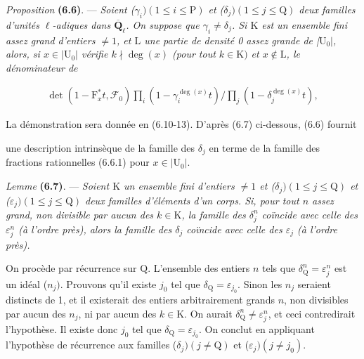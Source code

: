 \documentclass[10pt,leqno]{article}
\begin{document}
\noindent \emph{Proposition} \textbf{(6.6)}. — {\itshape Soient (\(\gamma _{i}) (1\leq i\leq \mathrm{P})\) et (\(\delta _{j}) (1\leq j\leq \mathrm{Q})\) deux familles d’unités \(\ell \)-adiques dans \(\overline{\mathbf{Q}}_{\ell }\). On suppose que \(\gamma _{i}\ne \delta _{j}\). Si \(\mathrm{K}\) est un ensemble fini assez grand d’entiers \(\ne 1\), et \(\mathrm{L}\) une partie de densité 0 assez grande de |\(\mathrm{U}_{0}|\), alors, si \(x\in |\mathrm{U}_{0}|\) vérifie \(k\nmid \operatorname{deg}(x)\) (pour tout \(k\in \mathrm{K})\) et \(x\notin \mathrm{L}\), le dénominateur de}\par

\begin{equation*}\begin{gathered}\operatorname{det}(1- \mathrm{F}_{x}^{*}t,\mathcal{F} _{0})\prod _{i}(1- \gamma _{i}^{\operatorname{deg}(x)}t)/\prod _{j}(1- \delta _{j}^{\operatorname{deg}(x)}t),\end{gathered}\tag{6.6.1}\end{equation*}

\par

\noindent La démonstration sera donnée en (6.10-13). D’après (6.7) ci-dessous, (6.6) fournit\par

\clearpage

\label{physical-26}\setcounter{page}{297}

\noindent une description intrinsèque de la famille des \(\delta _{j}\) en terme de la famille des fractions rationnelles (6.6.1) pour \(x\in |\mathrm{U}_{0}|\).\par

\noindent \emph{Lemme} \textbf{(6.7)}. — {\itshape Soient \(\mathrm{K}\) un ensemble fini d’entiers \(\ne 1\) et (\(\delta _{j}) (1\leq j\leq \mathrm{Q})\) et (\(\varepsilon _{j}) (1\leq j\leq \mathrm{Q})\) deux familles d’éléments d’un corps. Si, pour tout \(n\) assez grand, non divisible par aucun des \(k\in \mathrm{K}\), la famille des \(\delta _{j}^{n}\) coïncide avec celle des \(\varepsilon _{j}^{n}\) (à l’ordre près), alors la famille des \(\delta _{j}\) coïncide avec celle des \(\varepsilon _{j}\) (à l’ordre près).}\par

\noindent On procède par récurrence sur \(\mathrm{Q}\). L’ensemble des entiers \(n\) tels que \(\delta _{\mathrm{Q}}^{n}=\varepsilon _{j}^{n}\) est un idéal (\(n_{j})\). Prouvons qu’il existe \(j_{0}\) tel que \(\delta _{\mathrm{Q}}=\varepsilon _{j_{0}}\). Sinon les \(n_{j}\) seraient distincts de 1, et il existerait des entiers arbitrairement grands \(n\), non divisibles par aucun des \(n_{j}\), ni par aucun des \(k\in \mathrm{K}\). On aurait \(\delta _{\mathrm{Q}}^{n}\ne \varepsilon _{j}^{n}\), et ceci contredirait l’hypothèse. Il existe donc \(j_{0}\) tel que \(\delta _{\mathrm{Q}}=\varepsilon _{j_{0}}\). On conclut en appliquant l’hypothèse de récurrence aux familles (\(\delta _{j}) (j\ne \mathrm{Q})\) et (\(\varepsilon _{j}) (j\ne j_{0})\).\par
\end{document}
